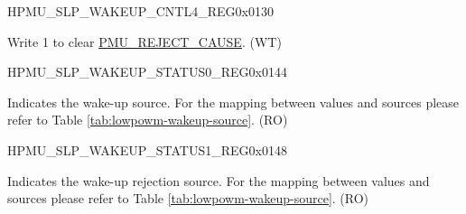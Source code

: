 \begin{register}{H}{PMU\_SLP\_WAKEUP\_CNTL4\_REG}{0x0130}\label{regdesc:PMUSLPWAKEUPCNTL4REG}
%
%
\regnewline%
\begin{regdesc}\begin{reglist}
\label{fielddesc:PMUSLPREJECTCAUSECLR}\item [PMU\_SLP\_REJECT\_CAUSE\_CLR] Write 1 to clear \hyperref[fielddesc:PMUREJECTCAUSE]{PMU\_REJECT\_CAUSE}. (WT)
\end{reglist}\end{regdesc}
\end{register}


\begin{register}{H}{PMU\_SLP\_WAKEUP\_STATUS0\_REG}{0x0144}\label{regdesc:PMUSLPWAKEUPSTATUS0REG}
%
%
\regnewline%
\begin{regdesc}\begin{reglist}
\label{fielddesc:PMUWAKEUPCAUSE}\item [PMU\_WAKEUP\_CAUSE] Indicates the wake-up source. For the mapping between values and sources please refer to Table \ref{tab:lowpowm-wakeup-source}. (RO)
\end{reglist}\end{regdesc}
\end{register}


\begin{register}{H}{PMU\_SLP\_WAKEUP\_STATUS1\_REG}{0x0148}\label{regdesc:PMUSLPWAKEUPSTATUS1REG}
%
%
\regnewline%
\begin{regdesc}\begin{reglist}
\label{fielddesc:PMUREJECTCAUSE}\item [PMU\_REJECT\_CAUSE] Indicates the wake-up rejection source. For the mapping between values and sources please refer to Table \ref{tab:lowpowm-wakeup-source}. (RO)
\end{reglist}\end{regdesc}
\end{register}


